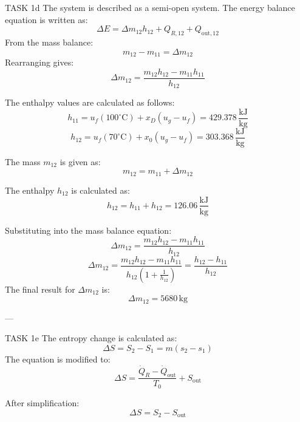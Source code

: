 TASK 1d  
The system is described as a semi-open system. The energy balance equation is written as:  
\[
\Delta E = \Delta m_{12} h_{12} + Q_{R,12} + Q_{\text{out},12}
\]  
From the mass balance:  
\[
m_{12} - m_{11} = \Delta m_{12}
\]  
Rearranging gives:  
\[
\Delta m_{12} = \frac{m_{12} h_{12} - m_{11} h_{11}}{h_{12}}
\]  

The enthalpy values are calculated as follows:  
\[
h_{11} = u_f(100^\circ\text{C}) + x_D (u_g - u_f) = 429.378 \, \frac{\text{kJ}}{\text{kg}}
\]  
\[
h_{12} = u_f(70^\circ\text{C}) + x_0 (u_g - u_f) = 303.368 \, \frac{\text{kJ}}{\text{kg}}
\]  

The mass \( m_{12} \) is given as:  
\[
m_{12} = m_{11} + \Delta m_{12}
\]  

The enthalpy \( h_{12} \) is calculated as:  
\[
h_{12} = h_{11} + h_{12} = 126.06 \, \frac{\text{kJ}}{\text{kg}}
\]  

Substituting into the mass balance equation:  
\[
\Delta m_{12} = \frac{m_{12} h_{12} - m_{11} h_{11}}{h_{12}}
\]  
\[
\Delta m_{12} = \frac{m_{12} h_{12} - m_{11} h_{11}}{h_{12} \left(1 + \frac{1}{h_{12}}\right)} = \frac{h_{12} - h_{11}}{h_{12}}
\]  
The final result for \( \Delta m_{12} \) is:  
\[
\Delta m_{12} = 5680 \, \text{kg}
\]  

---

TASK 1e  
The entropy change is calculated as:  
\[
\Delta S = S_2 - S_1 = m (s_2 - s_1)
\]  
The equation is modified to:  
\[
\Delta S = \frac{\dot{Q}_R - \dot{Q}_{\text{out}}}{T_0} + S_{\text{out}}
\]  

After simplification:  
\[
\Delta S = S_2 - S_{\text{out}}
\]